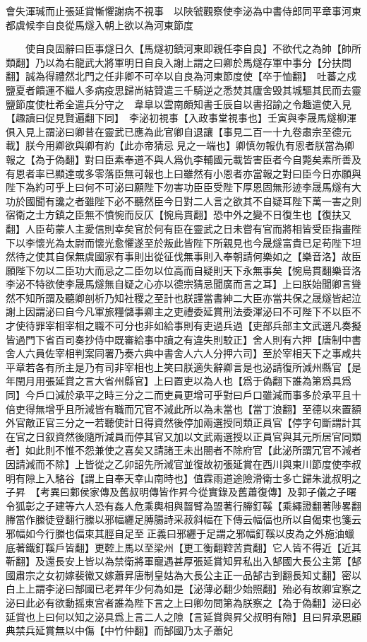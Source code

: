 會失渾瑊而止張延賞慚懼謝病不視事　以陜虢觀察使李泌為中書侍郎同平章事河東都虞候李自良從馬燧入朝上欲以為河東節度

　　使自良固辭曰臣事燧日久【馬燧初鎮河東即親任李自良】不欲代之為帥【帥所類翻】乃以為右龍武大將軍明日自良入謝上謂之曰卿於馬燧存軍中事分【分扶問翻】誠為得禮然北門之任非卿不可卒以自良為河東節度使【卒于恤翻】　吐蕃之戍鹽夏者饋運不繼人多病疫思歸尚結贊遣三千騎逆之悉焚其廬舍毁其城驅其民而去靈鹽節度使杜希全遣兵分守之　韋臯以雲南頗知書壬辰自以書招諭之令趣遣使入見【趣讀曰促見賢遍翻下同】　李泌初視事【入政事堂視事也】壬寅與李晟馬燧柳渾俱入見上謂泌曰卿昔在靈武已應為此官卿自退讓【事見二百一十九卷肅宗至德元載】朕今用卿欲與卿有約【此亦帝猜忌見之一端也】卿慎勿報仇有恩者朕當為卿報之【為于偽翻】對曰臣素奉道不與人爲仇李輔國元載皆害臣者今自斃矣素所善及有恩者率已顯達或多零落臣無可報也上曰雖然有小恩者亦當報之對曰臣今日亦願與陛下為約可乎上曰何不可泌曰願陛下勿害功臣臣受陛下厚恩固無形迹李晟馬燧有大功於國聞有讒之者雖陛下必不聽然臣今日對二人言之欲其不自疑耳陛下萬一害之則宿衛之士方鎮之臣無不憤惋而反仄【惋烏貫翻】恐中外之變不日復生也【復扶又翻】人臣苟蒙人主愛信則幸矣官於何有臣在靈武之日未嘗有官而將相皆受臣指畫陛下以李懷光為太尉而懷光愈懼遂至於叛此皆陛下所親見也今晟燧富貴已足苟陛下坦然待之使其自保無虞國家有事則出從征伐無事則入奉朝請何樂如之【樂音洛】故臣願陛下勿以二臣功大而忌之二臣勿以位高而自疑則天下永無事矣【惋烏貫翻樂音洛李泌不特欲使李晟馬燧無自疑之心亦以德宗猜忌聞廣而言之耳】上曰朕始聞卿言聳然不知所謂及聽卿剖析乃知社稷之至計也朕謹當書紳二大臣亦當共保之晟燧皆起泣謝上因謂泌曰自今凡軍旅糧儲事卿主之吏禮委延賞刑法委渾泌曰不可陛下不以臣不才使待罪宰相宰相之職不可分也非如給事則有吏過兵過【吏部兵部主文武選凡奏擬皆過門下省百司奏抄侍中既審給事中讀之有違失則駮正】舍人則有六押【唐制中書舍人六員佐宰相判案同署乃奏六典中書舍人六人分押六司】至於宰相天下之事咸共平章若各有所主是乃有司非宰相也上笑曰朕適失辭卿言是也泌請復所減州縣官【是年閏月用張延賞之言大省州縣官】上曰置吏以為人也【爲于偽翻下誰為第爲具爲同】今戶口減於承平之時三分之二而吏員更增可乎對曰戶口雖減而事多於承平且十倍吏得無增乎且所減皆有職而冗官不減此所以為未當也【當丁浪翻】至德以來置額外官敵正官三分之一若聽使計日得資然後停加兩選授同類正員官【停字句斷謂計其在官之日叙資然後隨所減員而停其官又加以文武兩選授以正員官與其元所居官同類者】如此則不惟不怨兼使之喜矣又請諸王未出閤者不除府官【此泌所謂冗官不減者因請減而不除】上皆從之乙卯詔先所減官並復故初張延賞在西川與東川節度使李叔明有隙上入駱谷【謂上自奉天幸山南時也】值霖雨道途險滑衛士多亡歸朱泚叔明之子昇　【考異曰鄴侯家傳及舊叔明傳皆作昇今從實錄及舊蕭復傳】及郭子儀之子曙令狐彰之子建等六人恐有姦人危乘輿相與齧臂為盟著行幐釘鞵【乘繩證翻著陟畧翻幐當作縢徒登翻行縢以邪幅纒足膊腸詩采菽斜幅在下傳云幅偪也所以自偈束也箋云邪幅如今行縢也偪束其脛自足至正義曰邪纒于足謂之邪幅釘鞵以皮為之外施油蠟底著鐵釘鞵戶皆翻】更鞚上馬以至梁州【更工衡翻鞚苦貢翻】它人皆不得近【近其靳翻】及還長安上皆以為禁衛將軍寵遇甚厚張延賞知昇私出入郜國大長公主第【郜國肅宗之女初嫁裴徽又嫁蕭昇唐制皇姑為大長公主正一品郜古到翻長知丈翻】密以白上上謂李泌曰郜國已老昇年少何為如是【泌薄必翻少始照翻】殆必有故卿宜察之泌曰此必有欲動摇東宫者誰為陛下言之上曰卿勿問第為朕察之【為于偽翻】泌曰必延賞也上曰何以知之泌具爲上言二人之隙【言延賞與昇父叔明有隙】且曰昇承恩顧典禁兵延賞無以中傷【中竹仲翻】而郜國乃太子蕭妃